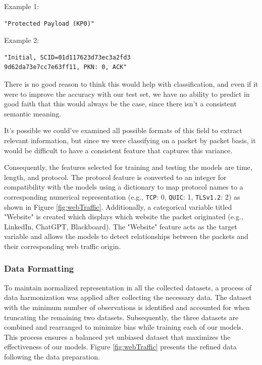 \documentclass[10pt,sigconf,letterpaper,nonacm]{acmart}
\begin{document}
Example 1:
\begin{verbatim}
"Protected Payload (KP0)"
\end{verbatim}

Example 2:
\begin{verbatim}
"Initial, SCID=01d117623d73ec3a2fd3
9d62da73e7cc7e63ff11, PKN: 0, ACK"
\end{verbatim}

There is no good reason to think this would help with classification, and even if it were to improve the accuracy with our test set, we have no ability to predict in good faith that this would always be the case, since there isn't a consistent semantic meaning.

It's possible we could've examined all possible formats of this field to extract relevant information, but since we were classifying on a packet by packet basis, it would be difficult to have a consistent feature that captures this variance.

Consequently, the features selected for training and testing the models are time, length, and protocol. The protocol feature is converted to an integer for compatibility with 
the models using a dictionary to map protocol names to a corresponding numerical representation (e.g., \texttt{TCP}: 0, \texttt{QUIC}: 1, \texttt{TLSv1.2}: 2) as shown in Figure \ref{fig:webTraffic}.  Additionally, a categorical variable titled "Website" 
is created which displays which website the packet originated (e.g., LinkedIn, ChatGPT, Blackboard). The "Website" feature acts as the target variable and allows 
the models to detect relationships between the packets and their corresponding web traffic origin. 

\subsubsection{Data Formatting}
To maintain normalized representation in all the collected datasets, a process of data harmonization 
was applied after collecting the necessary data. The dataset with the minimum number of observations is identified and accounted for when
truncating the remaining two datasets. Subsequently, the three datasets are combined and rearranged to minimize bias while training each of our models.
This process ensures a balanced yet unbiased dataset that maximizes the effectiveness of our models. Figure \ref{fig:webTraffic} presents the refined data following the data preparation. 
\end{document}
